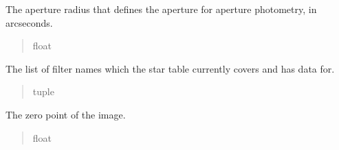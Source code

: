 \documentclass[letterpaper,11pt,english]{sphinxmanual}
\begin{document}
\begin{savenotes}
\begin{fulllineitems}
\begin{savenotes}\begin{fulllineitems}
\label{\detokenize{code/opihiexarata.photometry.solution:opihiexarata.photometry.solution.PhotometricSolution.aperture_radius}}
\pysigstartsignatures
{}
\pysigstopsignatures
\sphinxAtStartPar
The aperture radius that defines the aperture for aperture photometry,
in arcseconds.
\begin{quote}\begin{description}
\sphinxAtStartPar
float

\end{description}\end{quote}

\end{fulllineitems}\end{savenotes}


\begin{savenotes}\begin{fulllineitems}
\label{\detokenize{code/opihiexarata.photometry.solution:opihiexarata.photometry.solution.PhotometricSolution.available_filters}}
\pysigstartsignatures
{}
\pysigstopsignatures
\sphinxAtStartPar
The list of filter names which the star table currently covers and has
data for.
\begin{quote}\begin{description}
\sphinxAtStartPar
tuple

\end{description}\end{quote}

\end{fulllineitems}\end{savenotes}


\begin{savenotes}\begin{fulllineitems}
\label{\detokenize{code/opihiexarata.photometry.solution:opihiexarata.photometry.solution.PhotometricSolution.zero_point}}
\pysigstartsignatures
{}
\pysigstopsignatures
\sphinxAtStartPar
The zero point of the image.
\begin{quote}\begin{description}
\sphinxAtStartPar
float


\end{description}
\end{quote}
\end{fulllineitems}
\end{savenotes}
\end{fulllineitems}
\end{savenotes}
\end{document}
